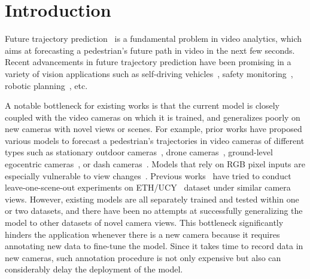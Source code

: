 \documentclass[runningheads]{eccv2020/llncs}
\begin{document}
\section{Introduction}
Future trajectory prediction~\cite{kitani2012activity,alahi2016social,gupta2018social,liang2019peeking,sadeghian2018sophie,lee2017desire,liang2020garden} is a fundamental problem in video analytics, which aims at forecasting a pedestrian's future path in video in the next few seconds. Recent advancements in future trajectory prediction have been promising in a variety of vision applications such as
self-driving vehicles~\cite{bansal2018chauffeurnet,chai2019multipath,chang2019argoverse}, safety monitoring~\cite{liang2019peeking}, robotic planning~\cite{rhinehart2017first,rhinehart2018r2p2}, etc.

A notable bottleneck for existing works is that the current model is closely coupled with the video cameras on which it is trained, and generalizes poorly on new cameras with novel views or scenes. 
For example, prior works have proposed various models to forecast a pedestrian's trajectories in video cameras of different types such as stationary outdoor cameras~\cite{oh2011large,liang2019focal,alahi2016social,gupta2018social,lerner2007crowds,luber2010people}, drone cameras~\cite{sadeghian2018sophie,deo2020trajectory,li2019way}, ground-level egocentric cameras~\cite{yagi2018future,rhinehart2017first,styles2019multiple}, or dash cameras~\cite{mangalam2019disentangling,styles2019forecasting,chang2019argoverse}. 
Models that rely on RGB pixel inputs are especially vulnerable to view changes~\cite{liang2019peeking,liang2020garden,sadeghian2018sophie}.
Previous works~\cite{alahi2016social,gupta2018social,sadeghian2018sophie} have tried to conduct leave-one-scene-out experiments on ETH/UCY~\cite{pellegrini2010improving,lerner2007crowds} dataset under similar camera views.
However, existing models are all separately trained and tested within one or two datasets, and there have been no attempts at successfully generalizing the model to other datasets of novel camera views.
This bottleneck significantly hinders the application whenever there is a new camera because it requires annotating new data to fine-tune the model. Since it takes time to record data in new cameras, such annotation procedure is not only expensive but also can considerably delay the deployment of the model.
\end{document}

